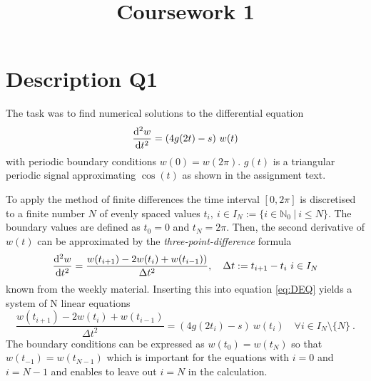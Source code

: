 \documentclass[11pt,a4paper]{article}
\title{Coursework 1}
\date{}
\begin{document}
\maketitle
\newcommand{\num}{\thenum \stepcounter{num} }
\newcommand{\aufgabe}[1]{\subsection*{Aufgabe A\thesubsection: #1}
    \stepcounter{subsection}}
\setcounter{subsection}{1}
\newcommand{\enumalph}{\renewcommand{\theenumi}{\alph{enumi}}}

\section*{Description Q1}
The task was to find numerical solutions to the differential
equation 
\begin{equation} \label{eq:DEQ}
    \dv[2]{w}{t} = (4g(2t)-s)\ w(t)
\end{equation}
with periodic boundary conditions $w(0) = w(2\pi)$. $g(t)$ is a
triangular periodic signal approximating $\cos(t)$ as shown in the 
assignment text.

To apply the method of finite differences the time interval $[0,2\pi]$
is discretised to a finite number $N$ of evenly spaced values 
$t_i,\ i\in I_N:=\{i\in \mathbb{N}_0\ | \ i\leq N\}$. The boundary values
are defined as $t_0=0$ and $t_N=2 \pi$.
Then, the second derivative of  $w(t)$ can be approximated by the 
\textit{three-point-difference} formula
\begin{equation}
    \dv[2]{w}{t} = \frac{w(t_{i+1})-2 w(t_i)+w(t_{i-1}) )}{\Delta t^2},
    \quad \Delta t := t_{i+1}-t_i\ i\in I_N
\end{equation}
known from the weekly material. Inserting this into equation \ref{eq:DEQ}
yields a system of N linear equations
\begin{equation}
    \frac{w(t_{i+1})-2 w(t_i)+w(t_{i-1}) }{\Delta t^2}
    =  (4g(2t_i)-s)\ w(t_i)\quad  \forall i\in I_N \setminus \{N\} \ .
\end{equation}
The boundary conditions can be expressed as $w(t_0)=w(t_{N})$
so that $w(t_{-1}) = w(t_{N-1})$ which is important for the equations
with $i=0$ and $i=N-1$ and enables to leave out $i=N$ in the calculation. 
\end{document}
